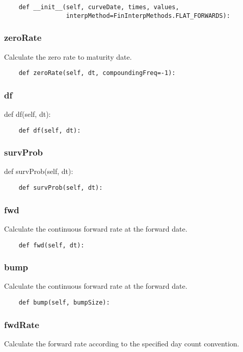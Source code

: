 \documentclass[twoside,11pt]{book}
\begin{document}
\begin{lstlisting}
    def __init__(self, curveDate, times, values,
                 interpMethod=FinInterpMethods.FLAT_FORWARDS):
\end{lstlisting}

\subsubsection*{{\bf zeroRate}}
Calculate the zero rate to maturity date.  

\begin{lstlisting}
    def zeroRate(self, dt, compoundingFreq=-1):
\end{lstlisting}

\subsubsection*{{\bf df}}
def df(self, dt): 

\begin{lstlisting}
    def df(self, dt):
\end{lstlisting}

\subsubsection*{{\bf survProb}}
def survProb(self, dt): 

\begin{lstlisting}
    def survProb(self, dt):
\end{lstlisting}

\subsubsection*{{\bf fwd}}
Calculate the continuous forward rate at the forward date.  

\begin{lstlisting}
    def fwd(self, dt):
\end{lstlisting}

\subsubsection*{{\bf bump}}
Calculate the continuous forward rate at the forward date.  

\begin{lstlisting}
    def bump(self, bumpSize):
\end{lstlisting}

\subsubsection*{{\bf fwdRate}}
Calculate the forward rate according to the specified day count convention.  
\end{document}

